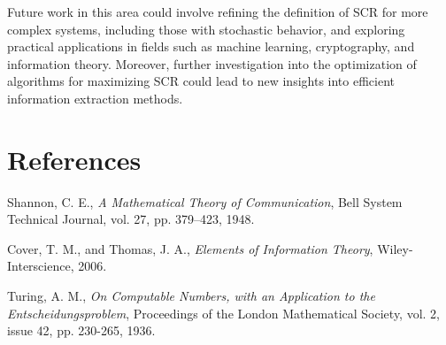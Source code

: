 \documentclass[11pt,a4paper]{article}
\theoremstyle{definition}
\theoremstyle{remark}
\numberwithin{equation}{section}
\begin{document}
Future work in this area could involve refining the definition of SCR for more complex systems, including those with stochastic behavior, and exploring practical applications in fields such as machine learning, cryptography, and information theory. Moreover, further investigation into the optimization of algorithms for maximizing SCR could lead to new insights into efficient information extraction methods.

\section{References}
\begin{thebibliography}{99}
    Shannon, C. E., \textit{A Mathematical Theory of Communication}, Bell System Technical Journal, vol. 27, pp. 379–423, 1948.
    
    Cover, T. M., and Thomas, J. A., \textit{Elements of Information Theory}, Wiley-Interscience, 2006.
    
    Turing, A. M., \textit{On Computable Numbers, with an Application to the Entscheidungsproblem}, Proceedings of the London Mathematical Society, vol. 2, issue 42, pp. 230-265, 1936.
\end{thebibliography}
\end{document}
